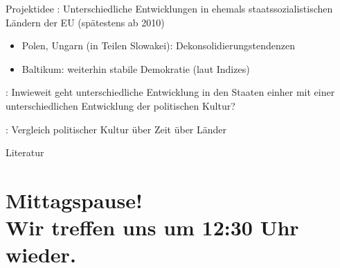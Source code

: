 \documentclass[11pt]{beamer}
\begin{document}
\begin{frame}[t]{Projektidee}
: Unterschiedliche Entwicklungen in ehemals staatssozialistischen Ländern der EU (spätestens ab 2010)

\begin{itemize}
	\item Polen, Ungarn (in Teilen Slowakei): Dekonsolidierungstendenzen
	\item Baltikum: weiterhin stabile Demokratie (laut Indizes) \pause
\end{itemize}

: Inwieweit geht unterschiedliche Entwicklung in den Staaten einher mit einer unterschiedlichen Entwicklung der politischen Kultur? \pause

: Vergleich politischer Kultur über Zeit über Länder

\end{frame}

\renewcommand*{\bibfont}{\scriptsize}

\begin{frame}[allowframebreaks]{Literatur}
	\nocite{*}
	\printbibliography[heading = none]
\end{frame}

\section{Mittagspause! \\ Wir treffen uns um 12:30 Uhr wieder.}
\end{document}
